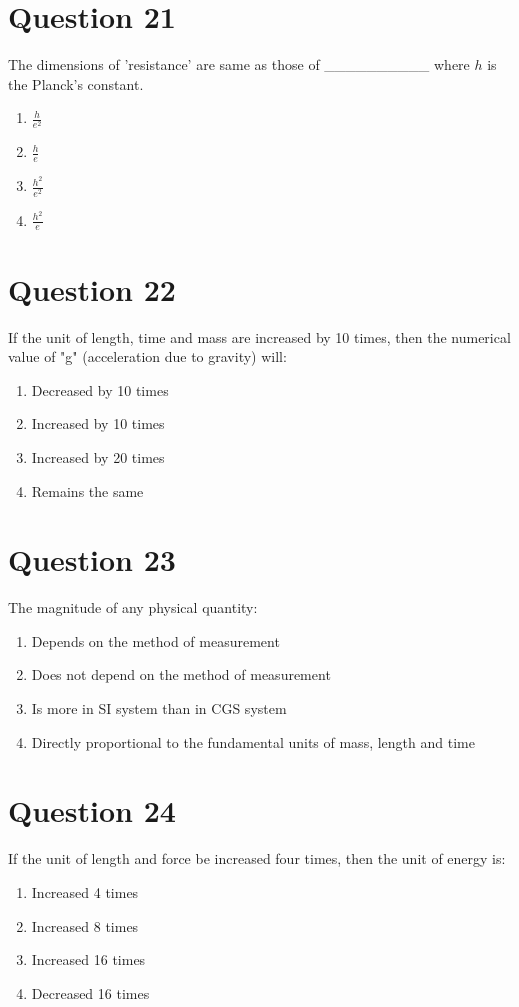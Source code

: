 \documentclass{article}
\begin{document}
\section*{Question 21}
The dimensions of 'resistance' are same as those of __________ where \(h\) is the Planck's constant.
\begin{enumerate}[label=(\alph*)]
\item \(\frac{h}{e^2}\)
\item \(\frac{h}{e}\)
\item \(\frac{h^2}{e^2}\)\newline
\item \(\frac{h^2}{e}\)
\end{enumerate}
\newpage
\section*{Question 22}
If the unit of length, time and mass are increased by 10 times, then the numerical value of "g" (acceleration due to gravity) will:
\begin{enumerate}[label=(\alph*)]
\item Decreased by 10 times
\item Increased by 10 times
\item Increased by 20 times
\item Remains the same
\end{enumerate}
\newpage
\section*{Question 23}
The magnitude of any physical quantity:
\begin{enumerate}[label=(\alph*)]
\item Depends on the method of measurement
\item Does not depend on the method of measurement
\item Is more in SI system than in CGS system
\item Directly proportional to the fundamental units of mass, length and time
\end{enumerate}
\newpage
\section*{Question 24}
If the unit of length and force be increased four times, then the unit of energy is:
\begin{enumerate}[label=(\alph*)]
\item Increased 4 times
\item Increased 8 times
\item Increased 16 times
\item Decreased 16 times
\end{enumerate}
\newpage
\end{document}

